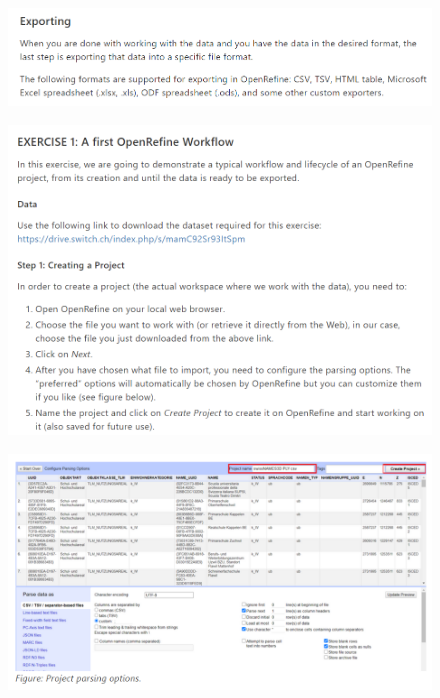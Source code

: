 \begin{figure}[H]
    \includegraphics[width=\linewidth]{./Figures/Appendices/worksheet/21.png}
\end{figure}
\begin{figure}[H]
    \includegraphics[width=\linewidth]{./Figures/Appendices/worksheet/22.png}
\end{figure}
\begin{figure}[H]
    \includegraphics[width=\linewidth]{./Figures/Appendices/worksheet/23.png}
\end{figure}
